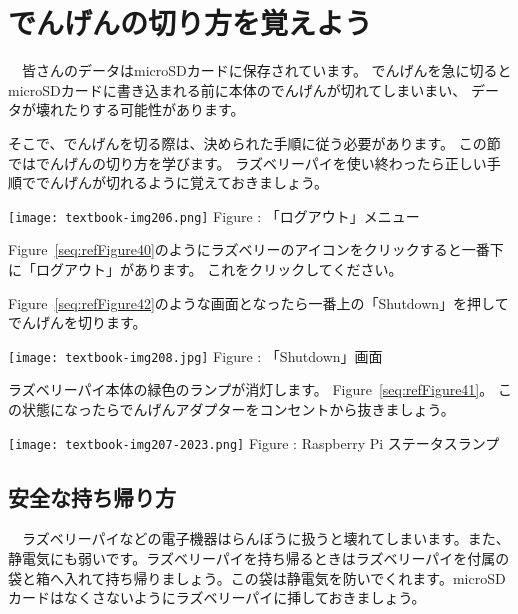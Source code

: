 \documentclass[a4paper,12pt]{jarticle}
\begin{document}
\section{でんげんの切り方を覚えよう}
\ \ 皆さんのデータはmicroSDカードに保存されています。
でんげんを急に切るとmicroSDカードに書き込まれる前に本体のでんげんが切れてしまいまい、
データが壊れたりする可能性があります。

そこで、でんげんを切る際は、決められた手順に従う必要があります。
この節ではでんげんの切り方を学びます。
ラズベリーパイを使い終わったら正しい手順ででんげんが切れるように覚えておきましょう。



\centering
\begin{minipage}{8.115cm}
  {\upshape
    \centering
    \texttt{[image: textbook-img206.png]}
    \newline
    Figure {\theFigure\label{seq:refFigure40}}: 「ログアウト」メニュー}
\end{minipage}
\begin{minipage}{7.115cm}
  Figure~\ref{seq:refFigure40}のようにラズベリーのアイコンをクリックすると一番下に「ログアウト」があります。
  これをクリックしてください。
\end{minipage}
\bigskip


\flushleft
\textcolor[rgb]{0.13333334,0.13333334,0.13333334}{Figure~\ref{seq:refFigure42}のような画面となったら一番上の「Shutdown」を押してでんげんを切ります。}
\bigskip
\centering
\begin{minipage}{8.225cm}
  {\upshape
    \texttt{[image: textbook-img208.jpg]}
    Figure {\theFigure\label{seq:refFigure42}}: 「Shutdown」画面}
\end{minipage}

\bigskip
\flushleft
\textcolor[rgb]{0.13333334,0.13333334,0.13333334}{ラズベリーパイ本体の緑色のランプが消灯します。
  Figure~\ref{seq:refFigure41}。
  この状態になったらでんげんアダプターをコンセントから抜きましょう。}

\bigskip
\centering
\begin{minipage}{8.207cm}
  {\upshape
    \texttt{[image: textbook-img207-2023.png]}
    \newline
    Figure {\theFigure\label{seq:refFigure41}}: Raspberry Pi
    ステータスランプ}
\end{minipage}
\clearpage\subsection{安全な持ち帰り方}
\flushleft
\ \ ラズベリーパイなどの電子機器はらんぼうに扱うと壊れてしまいます。また、静電気にも弱いです。ラズベリーパイを持ち帰るときはラズベリーパイを付属の袋と箱へ入れて持ち帰りましょう。この袋は静電気を防いでくれます。microSDカードはなくさないようにラズベリーパイに挿しておきましょう。

\clearpage
\end{document}

